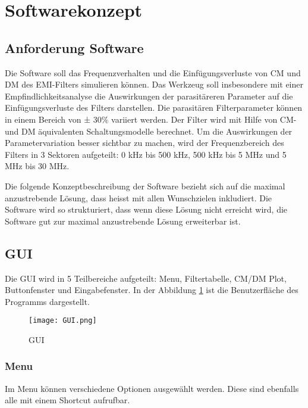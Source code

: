 \section{Softwarekonzept} \label{sec:softwarekonzept}

\subsection{Anforderung Software} \label{subsec:anforderungSoftware}

Die Software soll das Frequenzverhalten und die Einfügungsverluste von CM und DM des EMI-Filters simulieren können. Das Werkzeug soll insbesondere mit einer Empfindlichkeitsanalyse die Auswirkungen der parasitäreren Parameter auf die Einfügungsverluste des Filters darstellen. Die parasitären Filterparameter können in einem Bereich von ± 30\% variiert werden. Der Filter wird mit Hilfe von CM- und DM äquivalenten Schaltungsmodelle berechnet. Um die Auswirkungen der Parametervariation besser sichtbar zu machen, wird der Frequenzbereich des Filters in 3 Sektoren aufgeteilt: 0 kHz bis 500 kHz, 500 kHz bis 5 MHz und 5 MHz bis 30 MHz. 

Die folgende Konzeptbeschreibung der Software bezieht sich auf die maximal anzustrebende Lösung, dass heisst mit allen Wunschzielen inkludiert. Die Software wird so strukturiert, dass wenn diese Lösung nicht erreicht wird, die Software gut zur  maximal anzustrebende Lösung erweiterbar ist.

\subsection{GUI} \label{subsec:GUI}

Die GUI wird in 5 Teilbereiche aufgeteilt: Menu, Filtertabelle, CM/DM Plot, Buttonfenster und Eingabefenster. In der Abbildung \ref{fig:GUI}  ist die Benutzerfläche des Programms dargestellt.

\begin{figure}[H]
	\centering
	\texttt{[image: GUI.png]}
	\caption{GUI}
	\label{fig:GUI}
\end{figure}

\newpage

\subsubsection{Menu} \label{subsubsec:menu}

Im Menu können verschiedene Optionen ausgewählt werden. Diese sind ebenfalls alle mit einem Shortcut aufrufbar.
\bigskip

